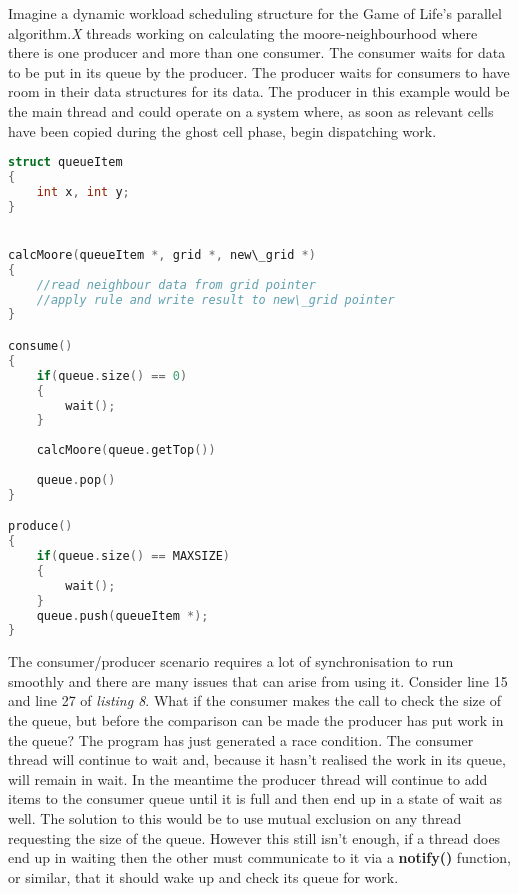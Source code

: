 Imagine a dynamic workload scheduling structure for the Game of Life's parallel algorithm.{\it X} threads working on calculating the moore-neighbourhood where there is one producer and more than one consumer. The consumer waits for data to be put in its queue by the producer.  The producer waits for consumers to have room in their data structures for its data. The producer in this example would be the main thread and could operate on a system where, as soon as relevant cells have been copied during the ghost cell phase, begin dispatching work.
\begin{lstlisting}[language=C, caption={Dynamic Work allocation pseudo-code for the Game of Life}]
struct queueItem
{
    int x, int y;
}


calcMoore(queueItem *, grid *, new\_grid *)
{
    //read neighbour data from grid pointer
    //apply rule and write result to new\_grid pointer
}

consume()
{
    if(queue.size() == 0)
    {
        wait();
    }
    
    calcMoore(queue.getTop())
    
    queue.pop()
}

produce()
{
    if(queue.size() == MAXSIZE)
    {
        wait();
    }
    queue.push(queueItem *);
}
\end{lstlisting}
The consumer/producer scenario requires a lot of synchronisation to run smoothly and there are many issues that can arise from using it. Consider line 15 and line 27 of {\it listing 8}. What if the consumer makes the call to check the size of the queue, but before the comparison can be made the producer has put work in the queue? The program has just generated a race condition. The consumer thread will continue to wait and, because it hasn't realised the work in its queue, will remain in wait. In the meantime the producer thread will continue to add items to the consumer queue until it is full and then end up in a state of wait as well. The solution to this would be to use mutual exclusion on any thread requesting the size of the queue. However this still isn't enough, if a thread does end up in waiting then the other must communicate to it via a {\bf notify()} function, or similar, that it should wake up and check its queue for work.\cite[p18]{ref14}